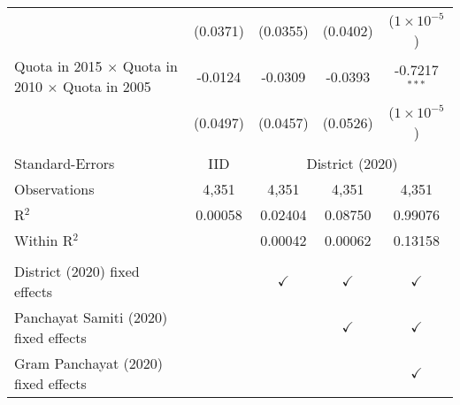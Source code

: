 \begin{tabular}{lcccc}
                                                                   & (0.0371)       & (0.0355)      & (0.0402)      & ($1\times 10^{-5}$)\\    
   Quota in 2015 $\times $ Quota in 2010 $\times $ Quota in 2005   & -0.0124        & -0.0309       & -0.0393       & -0.7217$^{***}$\\   
                                                                   & (0.0497)       & (0.0457)      & (0.0526)      & ($1\times 10^{-5}$)\\    
    \\
   Standard-Errors & IID & \multicolumn{3}{c}{District (2020)} \\ 
   Observations                                                    & 4,351          & 4,351         & 4,351         & 4,351\\  
   R$^2$                                                           & 0.00058        & 0.02404       & 0.08750       & 0.99076\\  
   Within R$^2$                                                    &                & 0.00042       & 0.00062       & 0.13158\\  
    \\
   District (2020) fixed effects                                   &                & $\checkmark$  & $\checkmark$  & $\checkmark$\\   
   Panchayat Samiti (2020) fixed effects                           &                &               & $\checkmark$  & $\checkmark$\\   
   Gram Panchayat (2020) fixed effects                             &                &               &               & $\checkmark$\\   
   \bottomrule
\end{tabular}
\par\endgroup


